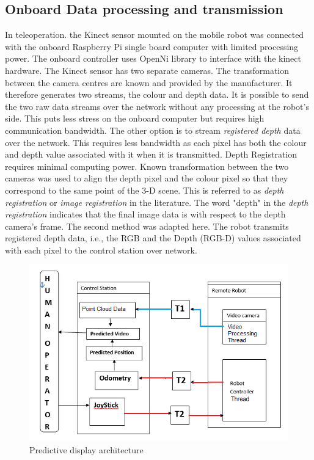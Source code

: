 \subsection{Onboard Data processing and transmission}
In teleoperation. the Kinect sensor mounted on the mobile robot was connected with the onboard Raspberry Pi single board computer with limited processing power. The onboard controller uses OpenNi library to interface with the kinect hardware.  The Kinect sensor has two separate cameras. The transformation between the camera centres are known and provided by the manufacturer. It therefore generates two streams, the colour and depth data. It is possible to send the two raw data streams over the network  without any processing at the robot's side. This  puts less stress on the onboard computer but requires high communication bandwidth. The other option is to stream \textit{ registered depth} data over the network. This requires less bandwidth as each pixel has both the colour and depth value associated with it when it is transmitted. Depth Registration requires minimal computing power. Known transformation between the two cameras was used to align the depth pixel and the colour pixel so that they correspond to the same point of the 3-D scene. This is referred to as \textit{depth registration} or \textit{image registration} in the literature. The word "depth" in the   \textit{depth registration} indicates  that the final image data is with respect to  the depth camera's frame. The second method was adapted here. The robot transmits registered depth data, i.e., the RGB and the Depth (RGB-D) values associated with each pixel to the control station over network. 


\begin{figure}
	\includegraphics[width=\linewidth,keepaspectratio]{Chapter7/fig/PredictorBlockDig}
	\caption{Predictive display architecture}	\label{fig:PDBLock}
\end{figure}

